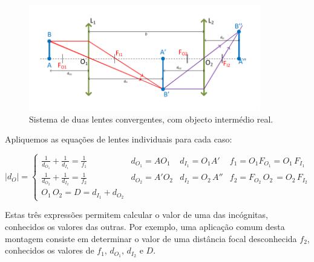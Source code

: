 \documentclass[a4paper,12pt]{article}      %
\begin{document}
\begin{figure}	[!htb]  \centering 
	\includegraphics[width=0.9\textwidth]{9-DuplaConvConv1}
	\caption{Sistema de duas lentes convergentes, com objecto intermédio real. \label{fig:DuplaConvConv1}} 
\end{figure}


Apliquemos as equações de lentes individuais para cada caso:

\begin{equation}
|d_O|  =  \left\{
\begin{array}{llll}
 \frac{1}{d_{O_1}} +  \frac{1}{d_{I_1}}   = \frac{1}{f_1}  & d_{O_1} = AO_1 & d_{I_1} = O_1A' & f_1 = O_1 F_{O_1} = O_1\,F_{I_1} \\
 \frac{1}{d_{O_2}} +  \frac{1}{d_{I_2}}   = \frac{1}{f_2}  & d_{O_2} = A'O_2 & d_{I_2} = O_2\,A'' & f_2 =  F_{O_2}\,O_2\, = O_2\,F_{I_2} \\
O_1\,O_2 = D = d_{I_1} + d_{O_2}
\end{array}  \right.
\label{eq:assoclentes_2}
\end{equation}


Estas três expressões permitem calcular o valor de uma das incógnitas, conhecidos os valores das outras. Por exemplo, uma aplicação comum desta montagem consiste em determinar o valor de uma distância focal desconhecida $f_2$, conhecidos os valores de $f_1$, $d_{O_1}$, $d_{I_2}$ e $D$.
\end{document}
